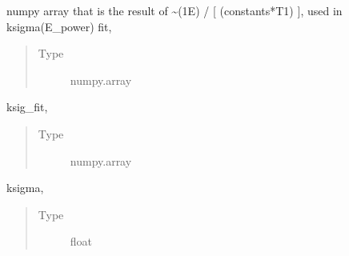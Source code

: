 \documentclass[letterpaper,10pt,english]{sphinxmanual}
\begin{document}
\begin{fulllineitems}
\begin{fulllineitems}
\label{\detokenize{dnpHydration:dnpLab.dnpHydration.HydrationResults.ksigma_array}}
numpy array that is the result of \textasciitilde{}(1\sphinxhyphen{}E) / {[} (constants*T1) {]},
used in ksigma(E\_power) fit,
\begin{quote}\begin{description}
\item[{Type}] \leavevmode
numpy.array

\end{description}\end{quote}

\end{fulllineitems}


\begin{fulllineitems}
\label{\detokenize{dnpHydration:dnpLab.dnpHydration.HydrationResults.ksigma_fit}}
ksig\_fit,
\begin{quote}\begin{description}
\item[{Type}] \leavevmode
numpy.array

\end{description}\end{quote}

\end{fulllineitems}


\begin{fulllineitems}
\label{\detokenize{dnpHydration:dnpLab.dnpHydration.HydrationResults.ksigma}}
ksigma,
\begin{quote}\begin{description}
\item[{Type}] \leavevmode
float

\end{description}\end{quote}

\end{fulllineitems}



\end{fulllineitems}
\end{document}
